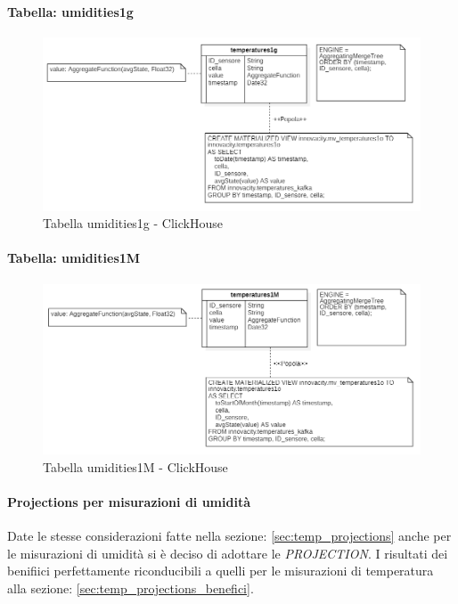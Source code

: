     \paragraph{Tabella:  umidities1g}
    \begin{figure}[H]
        \centering
        \includegraphics[width=1\textwidth]{../Images/SpecificaTecnica/temperatures1g.PNG}
        \caption{Tabella  umidities1g - ClickHouse}
        \label{fig: umidities1g}
        \end{figure}
    \paragraph{Tabella:  umidities1M}
    \begin{figure}[H]
        \centering
        \includegraphics[width=1\textwidth]{../Images/SpecificaTecnica/temperatures1Mese.PNG}
        \caption{Tabella  umidities1M - ClickHouse}
        \label{fig: umidities1M}
        \end{figure}
\paragraph{Projections per misurazioni di umidità} 
Date le stesse considerazioni fatte nella sezione: \ref{sec:temp_projections} anche per le misurazioni di umidità si è deciso di adottare le \textit{PROJECTION}.
I risultati dei benifiici perfettamente riconducibili a quelli per le misurazioni di temperatura alla sezione: \ref{sec:temp_projections_benefici}.

